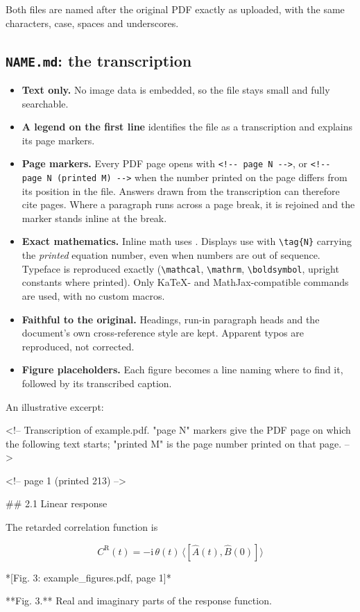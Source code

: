 \documentclass[11pt,a4paper]{article}
\begin{document}
Both files are named after the original PDF exactly as uploaded, with the same characters,
case, spaces and underscores.

\subsection{\texorpdfstring{\texttt{NAME.md}}{NAME.md}: the transcription}
\begin{itemize}
\item \textbf{Text only.} No image data is embedded, so the file stays small and fully searchable.
\item \textbf{A legend on the first line} identifies the file as a transcription and explains its page markers.
\item \textbf{Page markers.} Every PDF page opens with \texttt{<!-{}- page N -{}->}, or
  \texttt{<!-{}- page N (printed M) -{}->} when the number printed on the page differs from its
  position in the file. Answers drawn from the transcription can therefore cite pages. Where a
  paragraph runs across a page break, it is rejoined and the marker stands inline at the break.
\item \textbf{Exact mathematics.} Inline math uses . Displays use
   with \verb|\tag{N}| carrying the \emph{printed} equation number, even
  when numbers are out of sequence. Typeface is reproduced exactly (\verb|\mathcal|,
  \verb|\mathrm|, \verb|\boldsymbol|, upright constants where printed). Only KaTeX- and
  MathJax-compatible commands are used, with no custom macros.
\item \textbf{Faithful to the original.} Headings, run-in paragraph heads and the document's
  own cross-reference style are kept. Apparent typos are reproduced, not corrected.
\item \textbf{Figure placeholders.} Each figure becomes a line naming where to find it,
  followed by its transcribed caption.
\end{itemize}

\noindent An illustrative excerpt:
\begin{cmd}
<!-- Transcription of example.pdf. "page N" markers give the PDF page on which the following text starts; "printed M" is the page number printed on that page. -->

<!-- page 1 (printed 213) -->

## 2.1 Linear response

The retarded correlation function is

$$ C^{\mathrm{R}}(t) = -\mathrm{i}\,\theta(t)\,\langle [\hat A(t), \hat B(0)] \rangle \tag{2.14} $$

*[Fig. 3: example_figures.pdf, page 1]*

**Fig. 3.** Real and imaginary parts of the response function.
\end{cmd}
\end{document}
